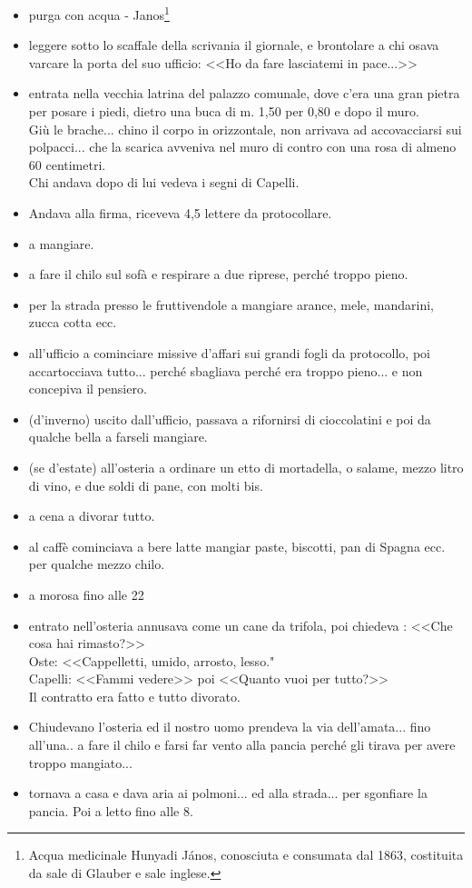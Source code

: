 \begin{itemize}
\item[9.00]purga con acqua - Janos\footnote{Acqua medicinale Hunyadi János, conosciuta e consumata dal 1863, costituita da sale di Glauber e sale inglese.}
\item[10.00]leggere sotto lo scaffale della scrivania il giornale, e brontolare a chi osava varcare la porta del suo ufficio: <<Ho da fare lasciatemi in pace...>>
\item[11.00]entrata nella vecchia latrina del palazzo comunale, dove c'era una gran pietra per posare i piedi, dietro una buca di m. 1,50 per 0,80 e dopo il muro.\\
Giù le brache... chino il corpo in orizzontale, non arrivava ad accovacciarsi sui polpacci... che la scarica avveniva nel muro di contro con una rosa di almeno 60 centimetri. \\
Chi andava dopo di lui vedeva i segni di Capelli.
\item[11.30]Andava alla firma, riceveva 4,5 lettere da protocollare.
\item[12.00] a mangiare.
\item[13.00] a fare il chilo sul sofà e respirare a due riprese, perché troppo pieno.
\item[13.30] per la strada presso le fruttivendole a mangiare arance, mele, mandarini, zucca cotta ecc.
\item[14.00] all'ufficio a cominciare missive d'affari sui grandi fogli da protocollo, poi accartocciava tutto... perché sbagliava perché era troppo pieno... e non concepiva il pensiero.
\item[17.00] (d'inverno) uscito dall'ufficio, passava a rifornirsi di cioccolatini e poi da qualche bella a farseli mangiare.
\item[18.00](se d'estate) all'osteria a ordinare un etto di mortadella, o salame, mezzo litro di vino, e due soldi di pane, con molti bis.
\item[19 - 20] a cena a divorar tutto.
\item[20.30] al caffè cominciava a bere latte mangiar paste, biscotti, pan di Spagna ecc. per qualche mezzo chilo.
\item[21.30] a morosa fino alle 22
\item[22.00] entrato nell'osteria annusava come un cane da trifola, poi chiedeva : <<Che cosa hai rimasto?>>\\
\indent Oste: <<Cappelletti, umido, arrosto, lesso."\\
\indent {}Capelli: <<Fammi vedere>> poi <<Quanto vuoi per tutto?>>\\
\indent Il contratto era fatto e tutto divorato.
\item[23.00] Chiudevano l'osteria ed il nostro uomo prendeva la via dell'amata... fino all'una.. a fare il chilo e farsi far vento alla pancia perché gli tirava per avere troppo mangiato...
\item[1.00] tornava a casa e dava aria ai polmoni... ed alla strada... per sgonfiare la pancia. Poi a letto fino alle 8.
\end{itemize}

